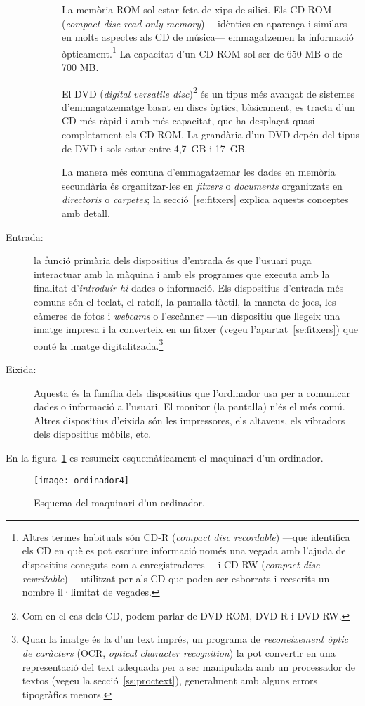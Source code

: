 \begin{description}
\begin{description}
    La memòria ROM sol estar feta de xips de silici. Els CD-ROM
    (\emph{compact disc read-only memory}) ---idèntics en aparença i
    similars en molts aspectes als CD de música--- emmagatzemen la
    informació òpticament.\footnote{Altres termes habituals són CD-R
      (\emph{compact disc recordable}) ---que identifica els CD en què
      es pot escriure informació només una vegada amb l'ajuda de
      dispositius coneguts com a enregistradores--- i CD-RW
      (\emph{compact disc rewritable}) ---utilitzat per als CD que
      poden ser esborrats i reescrits un nombre il·limitat de
      vegades.} La capacitat d'un CD-ROM sol ser de 650 MB o de 700
    MB.

    El DVD (\emph{digital versatile disc})\footnote{Com en el cas dels
      CD, podem parlar de DVD-ROM, DVD-R i DVD-RW.} és un tipus més
    avançat de sistemes d'emmagatzematge basat en discs òptics;
    bàsicament, es tracta d'un CD més ràpid i amb més capacitat, que
    ha desplaçat quasi completament els CD-ROM. La grandària d'un DVD
    depén del tipus de DVD i sols estar entre 4,7~GB i 17~GB.
    
    La manera més comuna d'emmagatzemar les dades en memòria
    secundària és organitzar-les en {\em fitxers} o \emph{documents}
    organitzats en \emph{directoris} o \emph{carpetes}; la
    secció~\ref{se:fitxers} explica aquests conceptes amb
    detall.\label{pg:menciofitxer}
  \end{description}

\item[Entrada:] la funció primària dels dispositius d'entrada és que
  l'usuari puga interactuar amb la màquina i amb els programes que
  executa amb la finalitat d'\emph{introduir-hi} dades o
  informació. Els dispositius d'entrada més comuns són el teclat, el
  ratolí, la pantalla tàctil, la maneta de jocs, les càmeres de fotos
  i \emph{webcams} o l'escànner ---un dispositiu que llegeix una
  imatge impresa i la converteix en un fitxer (vegeu
  l'apartat~\ref{se:fitxers}) que conté la imatge
  digitalitzada.\footnote{Quan la imatge és la d'un text imprés, un
    programa de \emph{reconeixement òptic de caràcters} (OCR,
    \emph{optical character recognition}) la pot convertir en una
    representació del text adequada per a ser manipulada amb un
    processador de textos (vegeu la secció~\ref{ss:proctext}),
    generalment amb alguns errors tipogràfics menors.}

\item[Eixida:] Aquesta és la família dels dispositius que l'ordinador
  usa per a comunicar dades o informació a l'usuari.  El monitor (la
  pantalla) n'és el més comú. Altres dispositius d'eixida són les
  impressores, els altaveus, els vibradors dels dispositius mòbils,
  etc.

\end{description}
En la figura~\ref{fg:ordinador} es resumeix esquemàticament el
maquinari d'un ordinador.
\begin{figure}
  \centering
  \texttt{[image: ordinador4]}
  \caption{Esquema del maquinari d'un ordinador.}
  \label{fg:ordinador}
\end{figure}


